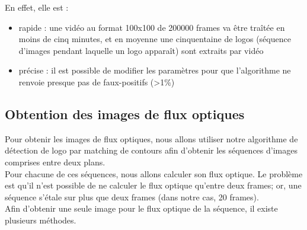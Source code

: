 \documentclass[11pt]{article}
\begin{document}
En effet, elle est :\\
\begin{itemize}
\item rapide : une vidéo au format 100x100 de 200000 frames va être traîtée en moins de cinq minutes, et en moyenne une cinquentaine de logos (séquence d'images pendant laquelle un logo apparaît) sont extraits par vidéo\\
\item précise : il est possible de modifier les paramètres pour que l'algorithme ne renvoie presque pas de faux-positifs (>1\%)\\
\end{itemize}

\subsection{Obtention des images de flux optiques}
\label{sec:orgeecd9ce}
Pour obtenir les images de flux optiques, nous allons utiliser notre algorithme de détection de logo par matching de contours afin d'obtenir les séquences d'images comprises entre deux plans.\\
Pour chacune de  ces séquences, nous allons calculer son flux optique. Le problème est qu'il n'est possible de ne calculer le flux optique qu'entre deux frames; or, une séquence s'étale sur plus que deux frames (dans notre cas, 20 frames).\\
Afin d'obtenir une seule image pour le flux optique de la séquence, il existe plusieurs méthodes.\\
\end{document}
